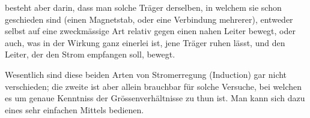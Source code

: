 \par\GaussVSourceGathering{43\textsuperscript{*}}
\par\clearpage
{}
\noindent besteht aber darin, dass man solche Träger derselben, in welchem sie schon geschieden sind (einen Magnetstab, oder eine Verbindung mehrerer), entweder selbst auf eine zweckmässige Art relativ gegen einen nahen Leiter bewegt, oder auch, was in der Wirkung ganz einerlei ist, jene Träger ruhen lässt, und den Leiter, der den Strom empfangen soll, bewegt.

Wesentlich sind diese beiden Arten von Stromerregung (Induction) gar nicht verschieden; die zweite ist aber allein brauchbar für solche Versuche, bei welchen es um genaue Kenntniss der Grössenverhältnisse zu thun ist. Man kann sich dazu eines sehr einfachen Mittels bedienen.

